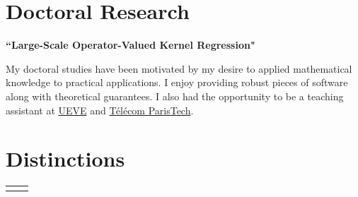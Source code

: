 \documentclass[10pt]{article} %
\begin{document}
\begin{paracol}{2}
\section{Doctoral Research}
%
{\raggedright\textbf{``Large-Scale Operator-Valued Kernel
                       Regression"} \\}
My doctoral studies  have been motivated by my desire to applied mathematical
knowledge to practical applications. I enjoy providing robust pieces of
software along with theoretical guarantees. I also had the opportunity to be a
teaching assistant at \href{https://www.univ-evry.fr/accueil.html}{UEVE} and
\href{https://www.telecom-paristech.fr/}{T\'el\'ecom ParisTech}.
%
%
\section{Distinctions}
%
%
%
%
%
\begin{supertabular}{rp{5.8cm}} %
%
%
%
%
%
%
\end{supertabular}
\medskip
%
%

\end{paracol}
\end{document}
